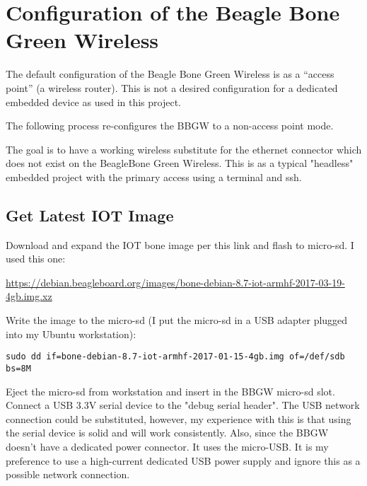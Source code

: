 %
%
%

\chapter{Configuration of the Beagle Bone Green Wireless}

The default configuration of the Beagle Bone Green Wireless is as a ``access 
point'' (a wireless router).  This is not a desired configuration for a 
dedicated embedded device as used in this project.

The following process re-configures the BBGW to a non-access point mode.

The goal is to have a working wireless substitute for the ethernet connector 
which does not exist on the BeagleBone Green Wireless.
This is as a typical "headless" embedded project with the primary access using 
a terminal and ssh.

\section{Get Latest IOT Image}

Download and expand the IOT bone image per this link and flash to micro-sd.  I 
used this one:

\url{https://debian.beagleboard.org/images/bone-debian-8.7-iot-armhf-2017-03-19-4gb.img.xz}

Write the image to the micro-sd (I put the micro-sd in a USB adapter plugged 
into my Ubuntu workstation):

\begin{verbatim}
sudo dd if=bone-debian-8.7-iot-armhf-2017-01-15-4gb.img of=/def/sdb bs=8M
\end{verbatim}

Eject the micro-sd from workstation and insert in the BBGW micro-sd slot.
Connect a USB 3.3V serial device to the "debug serial header".  The USB network 
connection could be substituted, however, my experience
with this is that using the serial device is solid and will work consistently.
Also, since the BBGW doesn't have a dedicated power connector.  It uses the 
micro-USB.
It is my preference to use a high-current dedicated USB power supply and ignore 
this as a possible network connection.

